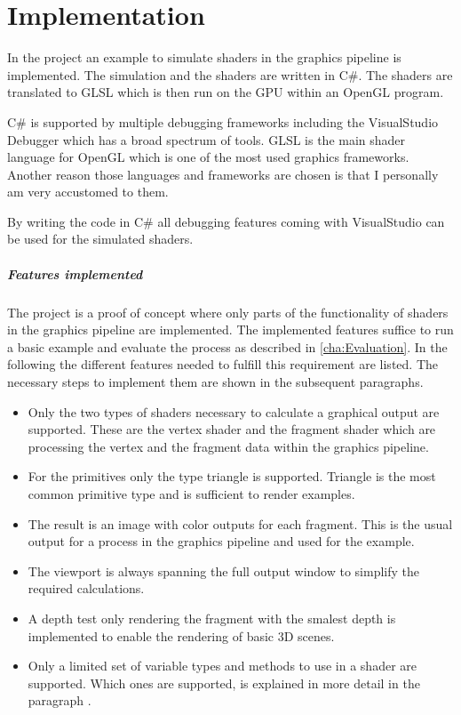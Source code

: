 
\chapter{Implementation}\label{cha:Implementation}

In the project  an example to simulate shaders in the graphics pipeline is implemented. The simulation and the shaders are written in C\#. The shaders are translated to GLSL which is then run on the GPU within an OpenGL program.

C\# is supported by multiple debugging frameworks including the VisualStudio Debugger which has a broad spectrum of tools.  GLSL is the main shader language for OpenGL which is one of the most used graphics frameworks. 
Another reason those languages and frameworks are chosen is that I personally am very accustomed to them.

By writing the code in C\# all debugging features coming with VisualStudio can be used for the simulated shaders.

\paragraph{Features implemented}
\label{paragraph:features}

The project is a proof of concept where only parts of the functionality of shaders in the graphics pipeline are implemented. The implemented features suffice to run a basic example and evaluate the process as described in \autoref{cha:Evaluation}. In the following the different features needed to fulfill this requirement are listed. The necessary steps to implement them are shown in the subsequent paragraphs.

\begin{itemize}
\item Only the two types of shaders necessary to calculate a graphical output are supported. These are the vertex shader and the fragment shader which are processing the vertex and the fragment data within the graphics pipeline.
\item For the primitives only the type triangle is supported. Triangle is the most common primitive type and is sufficient to render examples.
\item The result is an image with color outputs for each fragment. This is the usual output for a process in the graphics pipeline and used for the example.
\item The viewport is always spanning the full output window to simplify the required calculations.
\item A depth test only rendering the fragment with the smalest depth is implemented to enable the rendering of basic 3D scenes.
\item Only a limited set of variable types and methods to use in a shader are supported. Which ones are supported, is explained in more detail in the paragraph .
\end{itemize}

